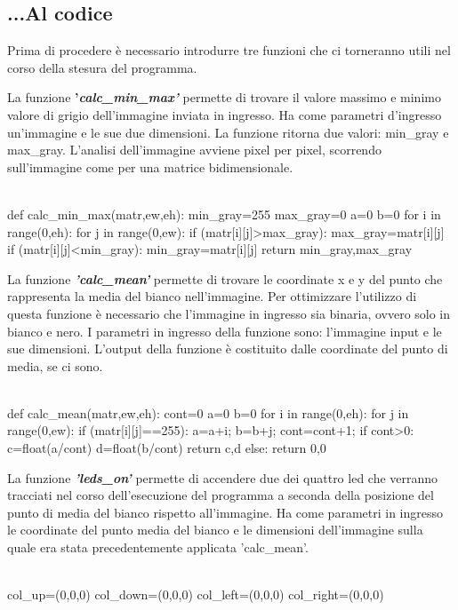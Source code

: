 \documentclass[12pt]{article}
\begin{document}
{\subsection{...Al codice}
\vspace{1cm} Prima di procedere \`e necessario introdurre tre funzioni che ci torneranno utili nel corso della stesura del programma. 

\vspace{1cm} La funzione \textbf{'\textit{calc\_min\_max'} }permette di trovare il valore massimo e minimo valore di grigio dell'immagine inviata in ingresso. Ha come parametri d'ingresso un'immagine e le sue due dimensioni. La funzione ritorna due valori: min\_gray e max\_gray. L'analisi dell'immagine avviene pixel per pixel, scorrendo sull'immagine come per una matrice bidimensionale.
\\
\\


 \begin{codice}
 	def calc_min_max(matr,ew,eh):
 	min_gray=255
 	max_gray=0
 	a=0
 	b=0
 	for i in range(0,eh):
 	   for j in range(0,ew):
 	      if (matr[i][j]>max_gray):
 	         max_gray=matr[i][j]
 	      if (matr[i][j]<min_gray):
 	         min_gray=matr[i][j]
 	return min_gray,max_gray
 \end{codice}

\vspace{1cm} La funzione \textbf{\textit{'calc\_mean'} }permette di trovare le coordinate x e y del punto che rappresenta la media del bianco nell'immagine. Per ottimizzare l'utilizzo di questa funzione \`e necessario che l'immagine in ingresso sia binaria, ovvero solo in bianco e nero. I parametri in ingresso della funzione sono: l'immagine input e le sue dimensioni. L'output della funzione \`e costituito dalle coordinate del punto di media, se ci sono.
\\
\\


\begin{codice}
def calc_mean(matr,ew,eh):
cont=0
a=0
b=0
for i in range(0,eh):
   for j in range(0,ew):
      if (matr[i][j]==255):
         a=a+i;
         b=b+j;
         cont=cont+1;
      if cont>0:
         c=float(a/cont)
         d=float(b/cont)
	return c,d
      else:
        return 0,0

\end{codice}

\vspace{1cm} La funzione \textbf{\textit{'leds\_on'}} permette di accendere due dei quattro led che verranno tracciati nel corso dell'esecuzione del programma a seconda della posizione del punto di media del bianco rispetto all'immagine. Ha come parametri in ingresso le coordinate del punto media del bianco e le dimensioni dell'immagine sulla quale era stata precedentemente applicata 'calc\_mean'.
\\
\\
\begin{codice}
	col_up=(0,0,0)
	col_down=(0,0,0)
	col_left=(0,0,0)
	col_right=(0,0,0)
	

\end{codice}}
\end{document}
